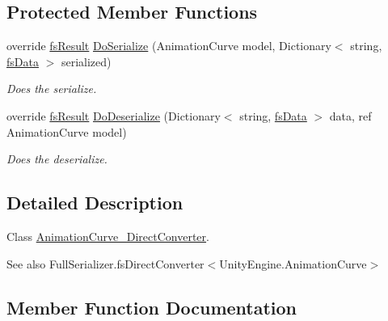 \subsection*{Protected Member Functions}
\begin{DoxyCompactItemize}
\item 
override \hyperlink{struct_full_serializer_1_1fs_result}{fs\+Result} \hyperlink{class_full_serializer_1_1_internal_1_1_direct_converters_1_1_animation_curve___direct_converter_a1459e59a56a0729f37ec9cf9ced6cde9}{Do\+Serialize} (Animation\+Curve model, Dictionary$<$ string, \hyperlink{class_full_serializer_1_1fs_data}{fs\+Data} $>$ serialized)
\begin{DoxyCompactList}\small\item\em Does the serialize. \end{DoxyCompactList}\item 
override \hyperlink{struct_full_serializer_1_1fs_result}{fs\+Result} \hyperlink{class_full_serializer_1_1_internal_1_1_direct_converters_1_1_animation_curve___direct_converter_ae2f2bd51a6e973292469f471a9978962}{Do\+Deserialize} (Dictionary$<$ string, \hyperlink{class_full_serializer_1_1fs_data}{fs\+Data} $>$ data, ref Animation\+Curve model)
\begin{DoxyCompactList}\small\item\em Does the deserialize. \end{DoxyCompactList}\end{DoxyCompactItemize}


\subsection{Detailed Description}
Class \hyperlink{class_full_serializer_1_1_internal_1_1_direct_converters_1_1_animation_curve___direct_converter}{Animation\+Curve\+\_\+\+Direct\+Converter}. 

\begin{DoxySeeAlso}{See also}
Full\+Serializer.\+fs\+Direct\+Converter$<$\+Unity\+Engine.\+Animation\+Curve$>$


\end{DoxySeeAlso}


\subsection{Member Function Documentation}
\mbox{\label{class_full_serializer_1_1_internal_1_1_direct_converters_1_1_animation_curve___direct_converter_ade5d37cdc1d926982bc5523d3745cfb7}} 
